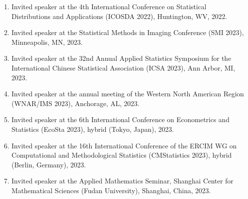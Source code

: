 \documentclass[12pt]{article}
\begin{document}
\begin{enumerate}
		\item Invited speaker at the 4th International Conference on 
		Statistical Distributions and Applications (ICOSDA 2022), 
		Huntington, WV, 2022. 
		
		\item Invited speaker at the Statistical Methods in Imaging 
		Conference (SMI 2023), Minneapolis, MN, 2023.
		
		\item Invited speaker at the 32nd Annual Applied Statistics 
		Symposium for the International Chinese Statistical 
		Association (ICSA 2023), Ann Arbor, MI, 2023.
		
		\item Invited speaker at the annual meeting of the Western 
		North American Region (WNAR/IMS 2023), Anchorage, AL, 2023.
		
		\item Invited speaker at the 6th International Conference on 
		Econometrics and Statistics (EcoSta 2023), hybrid (Tokyo, 
		Japan), 2023.
		
		\item Invited speaker at the 16th International Conference 
		of the ERCIM WG on Computational and Methodological 
		Statistics (CMStatistics 2023), hybrid (Berlin, Germany), 
		2023.
		
		\item Invited speaker at the Applied Mathematics Seminar, 
		Shanghai Center for Mathematical Sciences (Fudan 
		University), Shanghai, China, 2023.		
	\end{enumerate}
	
\end{document}
